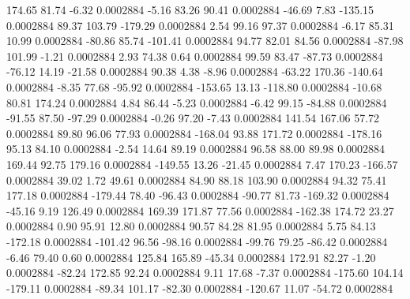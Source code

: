       174.65       81.74       -6.32     0.0002884
       -5.16       83.26       90.41     0.0002884
      -46.69        7.83     -135.15     0.0002884
       89.37      103.79     -179.29     0.0002884
        2.54       99.16       97.37     0.0002884
       -6.17       85.31       10.99     0.0002884
      -80.86       85.74     -101.41     0.0002884
       94.77       82.01       84.56     0.0002884
      -87.98      101.99       -1.21     0.0002884
        2.93       74.38        0.64     0.0002884
       99.59       83.47      -87.73     0.0002884
      -76.12       14.19      -21.58     0.0002884
       90.38        4.38       -8.96     0.0002884
      -63.22      170.36     -140.64     0.0002884
       -8.35       77.68      -95.92     0.0002884
     -153.65       13.13     -118.80     0.0002884
      -10.68       80.81      174.24     0.0002884
        4.84       86.44       -5.23     0.0002884
       -6.42       99.15      -84.88     0.0002884
      -91.55       87.50      -97.29     0.0002884
       -0.26       97.20       -7.43     0.0002884
      141.54      167.06       57.72     0.0002884
       89.80       96.06       77.93     0.0002884
     -168.04       93.88      171.72     0.0002884
     -178.16       95.13       84.10     0.0002884
       -2.54       14.64       89.19     0.0002884
       96.58       88.00       89.98     0.0002884
      169.44       92.75      179.16     0.0002884
     -149.55       13.26      -21.45     0.0002884
        7.47      170.23     -166.57     0.0002884
       39.02        1.72       49.61     0.0002884
       84.90       88.18      103.90     0.0002884
       94.32       75.41      177.18     0.0002884
     -179.44       78.40      -96.43     0.0002884
      -90.77       81.73     -169.32     0.0002884
      -45.16        9.19      126.49     0.0002884
      169.39      171.87       77.56     0.0002884
     -162.38      174.72       23.27     0.0002884
        0.90       95.91       12.80     0.0002884
       90.57       84.28       81.95     0.0002884
        5.75       84.13     -172.18     0.0002884
     -101.42       96.56      -98.16     0.0002884
      -99.76       79.25      -86.42     0.0002884
       -6.46       79.40        0.60     0.0002884
      125.84      165.89      -45.34     0.0002884
      172.91       82.27       -1.20     0.0002884
      -82.24      172.85       92.24     0.0002884
        9.11       17.68       -7.37     0.0002884
     -175.60      104.14     -179.11     0.0002884
      -89.34      101.17      -82.30     0.0002884
     -120.67       11.07      -54.72     0.0002884
